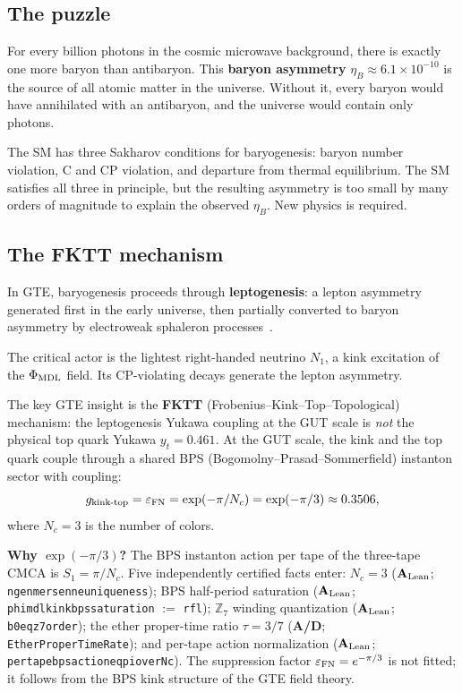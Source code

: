 \documentclass[11pt,a4paper]{article}
\newcommand{\term}[1]{\textbf{#1}}
\newcommand{\lean}[1]{%
  \penalty-100
  \begingroup\def\_{\textunderscore\allowbreak}\texttt{#1}\endgroup}
\newcommand{\CatAL}{\ensuremath{\mathbf{A}_{\rm Lean}}}
\newcommand{\CatAD}{\textbf{A/D}}
\newcommand{\etaB}{\eta_B}
\begin{document}
\subsection{The puzzle}

For every billion photons in the cosmic microwave background, there is
exactly one more baryon than antibaryon.
This \term{baryon asymmetry} $\etaB \approx 6.1 \times 10^{-10}$ is the
source of all atomic matter in the universe.
Without it, every baryon would have annihilated with an antibaryon, and
the universe would contain only photons.

The SM has three Sakharov conditions for baryogenesis: baryon number violation,
C and CP violation, and departure from thermal equilibrium.
The SM satisfies all three in principle, but the resulting asymmetry is
too small by many orders of magnitude to explain the observed $\etaB$.
New physics is required.

\subsection{The FKTT mechanism}

In GTE, baryogenesis proceeds through \term{leptogenesis}: a lepton asymmetry
generated first in the early universe, then partially converted to baryon
asymmetry by electroweak sphaleron processes~\cite{SpivackGTECompleteFramework}.

The critical actor is the lightest right-handed neutrino $N_1$, a kink
excitation of the $\Phi_{\rm MDL}$ field.
Its CP-violating decays generate the lepton asymmetry.

The key GTE insight is the \term{FKTT} (Frobenius--Kink--Top--Topological)
mechanism: the leptogenesis Yukawa coupling at the GUT scale is \emph{not}
the physical top quark Yukawa $y_t = 0.461$.
At the GUT scale, the kink and the top quark couple through a shared BPS
(Bogomolny--Prasad--Sommerfield) instanton sector with coupling:
\begin{equation}
  g_{\rm kink\text{-}top}
  = \varepsilon_{\rm FN}
  = \exp(-\pi/N_c)
  = \exp(-\pi/3)
  \approx 0.3506,
  \label{eq:eps_fn}
\end{equation}
where $N_c = 3$ is the number of colors.

\textbf{Why $\exp(-\pi/3)$?}
The BPS instanton action per tape of the three-tape CMCA is $S_1 = \pi/N_c$.
Five independently certified facts enter:
$N_c = 3$ (\CatAL; \lean{ngen\_3\_mersenne\_uniqueness});
BPS half-period saturation
(\CatAL; \lean{phi\_mdl\_kink\_bps\_saturation} $:=$ \texttt{rfl});
$\mathbb{Z}_7$ winding quantization
(\CatAL; \lean{b0\_eq\_z7\_order});
the ether proper-time ratio $\tau = 3/7$
(\CatAD; \lean{EtherProperTimeRate});
and per-tape action normalization
(\CatAL; \lean{per\_tape\_bps\_action\_eq\_pi\_over\_Nc}).
The suppression factor $\varepsilon_{\rm FN} = e^{-\pi/3}$ is not fitted;
it follows from the BPS kink structure of the GTE field theory.
\end{document}
